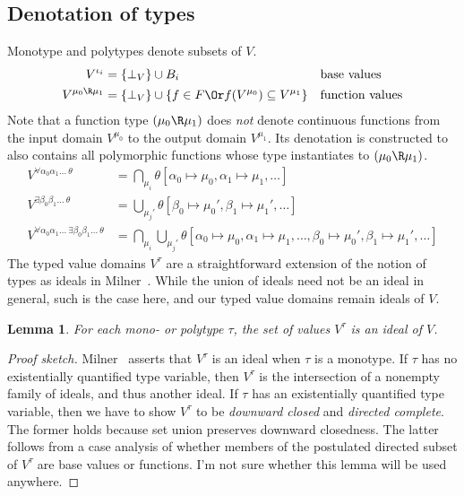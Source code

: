\documentclass{amsart}
\newtheorem{lemma}[subsection]{Lemma}
\begin{document}
\subsection*{Denotation of types}
Monotype and polytypes denote subsets of $V$.
\begin{align*}
V^{\iota_i} &= \{\bot_V\}\cup B_i &&\mbox{base values}
\\
V^{\mu_0 \R \mu_1} &=
  \{\bot_V\}\cup
  \{f\in F \Or f(V^{\mu_0}) \subseteq V^{\mu_1}\}
  &&\mbox{function values}
\end{align*}
Note that a function type $(\mu_0\R\mu_1)$ does \emph{not} denote
continuous functions from the input domain $V^{\mu_0}$ to the
output domain $V^{\mu_1}$. Its denotation is constructed to also
contains all polymorphic functions whose type instantiates to 
$(\mu_0\R\mu_1)$.
\begin{align*}
V^{\forall\alpha_0\alpha_1\ldots~\theta} &=
  \bigcap_{\mu_i}
  \theta[\alpha_0\mapsto\mu_0,\alpha_1\mapsto\mu_1,\ldots]
\\
V^{\exists\beta_0\beta_1\ldots~\theta} &=
  \bigcup_{\mu_j'}
  \theta[\beta_0\mapsto\mu_0',\beta_1\mapsto\mu_1',\ldots]
\\
V^{\forall\alpha_0\alpha_1\ldots~\exists\beta_0\beta_1\ldots~\theta}
&=\bigcap_{\mu_i}
  \bigcup_{\mu_j'} \theta[
  \alpha_0\mapsto\mu_0,\alpha_1\mapsto\mu_1,\ldots,
  \beta_0\mapsto\mu_0',\beta_1\mapsto\mu_1',\ldots]
\end{align*}
The typed value domains $V^\tau$ are a straightforward extension
of the notion of types as ideals in Milner~\cite{Milner78}. While
the union of ideals need not be an ideal in general, such is the
case here, and our typed value domains remain ideals of $V$.

\begin{lemma}
For each mono- or polytype $\tau$, the set of values $V^\tau$ is
an ideal of $V$.
\end{lemma}

\begin{proof}[Proof sketch]
Milner~\cite{Milner78} asserts that $V^\tau$ is an ideal when
$\tau$ is a monotype. If $\tau$ has no existentially quantified
type variable, then $V^\tau$ is the intersection of a nonempty
family of ideals, and thus another ideal. If $\tau$ has an
existentially quantified type variable, then we have to show
$V^\tau$ to be \emph{downward closed} and \emph{directed
complete}. The former holds because set union preserves downward
closedness. The latter follows from a case analysis of whether
members of the postulated directed subset of $V^\tau$ are base
values or functions. I'm not sure whether this lemma will be used
anywhere.
\end{proof}
\end{document}
